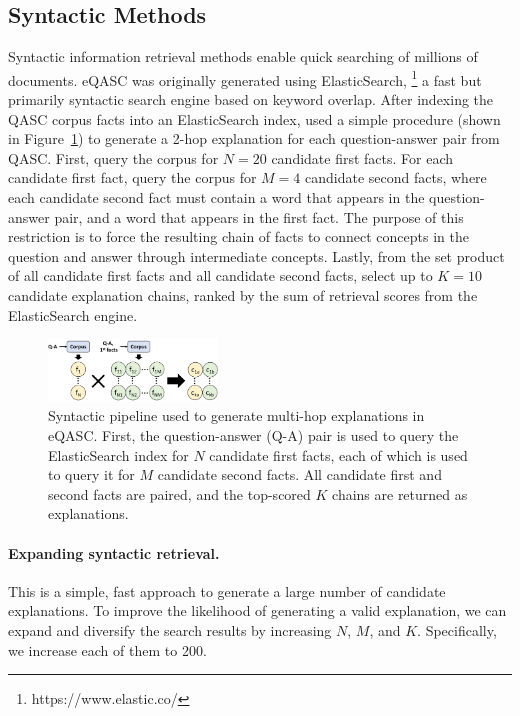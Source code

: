\documentclass[letterpaper]{article} %
\begin{document}
\subsection{Syntactic Methods}\label{sec:syntactic}
Syntactic information retrieval methods enable quick searching of millions of documents.
eQASC was originally generated using ElasticSearch, \footnote{https://www.elastic.co/} a fast but primarily syntactic search engine based on keyword overlap. After indexing the QASC corpus facts into an ElasticSearch index, \citet{jhamtani-clark-2020-learning} used a simple procedure (shown in Figure~\ref{fig:syntactic_pipeline}) to generate a 2-hop explanation for each question-answer pair from QASC. First, query the corpus for $N=20$ candidate first facts. For each candidate first fact, query the corpus for $M=4$ candidate second facts, where each candidate second fact must contain a word that appears in the question-answer pair, and a word that appears in the first fact. The purpose of this restriction is to force the resulting chain of facts to connect concepts in the question and answer through intermediate concepts. Lastly, from the set product of all candidate first facts and all candidate second facts, select up to $K=10$ candidate explanation chains, ranked by the sum of retrieval scores from the ElasticSearch engine.

\begin{figure}
    \centering
    \includegraphics[width=0.4\textwidth]{syntactic_pipeline.pdf}
    \caption{Syntactic pipeline used to generate multi-hop explanations in eQASC. First, the question-answer (Q-A) pair is used to query the ElasticSearch index for $N$ candidate first facts, each of which is used to query it for $M$ candidate second facts. All candidate first and second facts are paired, and the top-scored $K$ chains are returned as explanations. }
    \label{fig:syntactic_pipeline}
\end{figure}

\paragraph{Expanding syntactic retrieval.}
This is a simple, fast approach to generate a large number of candidate explanations. To improve the likelihood of generating a valid explanation, we can expand and diversify the search results by increasing $N$, $M$, and $K$. Specifically, we increase each of them to 200.
\end{document}
